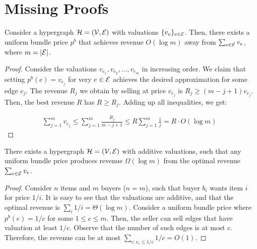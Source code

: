 \section{Missing Proofs}
\label{sec:appendix}

\begin{lemma}
Consider a hypergraph $\mathcal{H} = (\mathcal{V}, \mathcal{E})$ with valuations $\{v_e\}_{e \in \mathcal{E}}$. Then, there exists a uniform bundle price $p^{b}$ that achieves revenue $O(\log m)$ away from  $\sum_{e \in \mathcal{E}} v_e$, where $m = |\mathcal{E}|$.
\end{lemma}

\begin{proof}
Consider the valuations $v_{e_1}, v_{e_2}, \dots, v_{e_m}$ in increasing order. We claim that setting $p^{b}(e)  = v_{e_j}$ for very $e \in \mathcal{E}$ achieves the 
desired approximation for some edge $e_{j}$. 
The revenue $R_j$ we obtain by selling at price $v_{e_j}$ is $R_j \geq (m-j+1)v_{e_j} $. Then, the best revenue $R$ has $R \geq R_j$.
Adding up all inequalities, we get:
	
	\begin{equation*}
	\begin{aligned}
	\sum_{j=1}^m v_{e_j} \leq  \sum_{j=1}^m \frac{R_j}{m-j+1} \leq R \sum_{j=1}^m \frac{1}{j} = R \cdot O(\log m) 
	\end{aligned}
	\end{equation*}
\end{proof}


\begin{lemma} \label{lem:lb1}
There exists a hypergraph $\mathcal{H} = (\mathcal{V}, \mathcal{E})$ with additive valuations, such that any uniform bundle price produces revenue $\Omega(\log m)$ from the optimal revenue
$\sum_{e \in \mathcal{E}} v_e$.
\end{lemma}	

\begin{proof}
	Consider $n$ items and $m$ buyers ($n=m$), such that buyer $b_i$ wants item $i$ for price $1/i$. It is easy to see that the valuations are additive, and that the optimal revenue
	is $\sum_i 1/i = \Theta(\log m)$. Consider a uniform bundle price where $p^b(e) = 1/c$ for some $1 \leq c \leq m$. Then, the seller can sell edges that have valuation at least $1/c$. Observe that the number of such edges is at most $c$. Therefore, the revenue can be at most $\sum_{e:v_e \leq 1/c} 1/c = O(1)$.
\end{proof}

